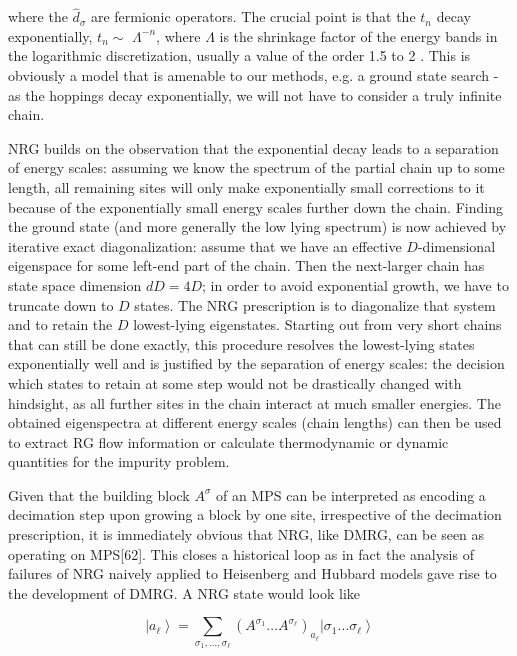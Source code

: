 \documentclass[12pt]{article}
\begin{document}
where the $\hat{d}_{\sigma}$ are fermionic operators. The crucial point is that the $t_{n}$ decay exponentially, $t_{n} \sim$ $\Lambda^{-n}$, where $\Lambda$ is the shrinkage factor of the energy bands in the logarithmic discretization, usually a value of the order 1.5 to 2 . This is obviously a model that is amenable to our methods, e.g. a ground state search - as the hoppings decay exponentially, we will not have to consider a truly infinite chain.

NRG builds on the observation that the exponential decay leads to a separation of energy scales: assuming we know the spectrum of the partial chain up to some length, all remaining sites will only make exponentially small corrections to it because of the exponentially small energy scales further down the chain. Finding the ground state (and more generally the low lying spectrum) is now achieved by iterative exact diagonalization: assume that we have an effective $D$-dimensional eigenspace for some left-end part of the chain. Then the next-larger chain has state space dimension $d D=4 D$; in order to avoid exponential growth, we have to truncate down to $D$ states. The NRG prescription is to diagonalize that system and to retain the $D$ lowest-lying eigenstates. Starting out from very short chains that can still be done exactly, this procedure resolves the lowest-lying states exponentially well and is justified by the separation of energy scales: the decision which states to retain at some step would not be drastically changed with hindsight, as all further sites in the chain interact at much smaller energies. The obtained eigenspectra at different energy scales (chain lengths) can then be used to extract RG flow information or calculate thermodynamic or dynamic quantities for the impurity problem.

Given that the building block $A^{\sigma}$ of an MPS can be interpreted as encoding a decimation step upon growing a block by one site, irrespective of the decimation prescription, it is immediately obvious that NRG, like DMRG, can be seen as operating on MPS[62]. This closes a historical loop as in fact the analysis of failures of NRG naively applied to Heisenberg and Hubbard models gave rise to the development of DMRG. A NRG state would look like


\begin{equation*}
\left|a_{\ell}\right\rangle=\sum_{\sigma_{1}, \ldots, \sigma_{\ell}}\left(A^{\sigma_{1}} \ldots A^{\sigma_{\ell}}\right)_{a_{\ell}}\left|\sigma_{1} \ldots \sigma_{\ell}\right\rangle \tag{321}
\end{equation*}
\end{document}
